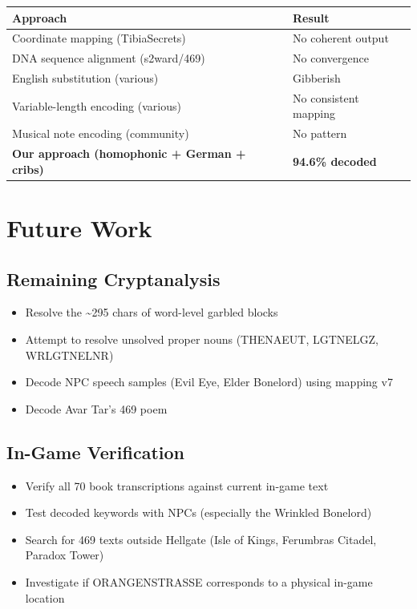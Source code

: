 \documentclass[11pt,a4paper]{article}
\begin{document}
\begin{table}[h]
\centering
\begin{tabular}{ll}
\toprule
Approach & Result \\
\midrule
Coordinate mapping (TibiaSecrets) & No coherent output \\
DNA sequence alignment (s2ward/469) & No convergence \\
English substitution (various) & Gibberish \\
Variable-length encoding (various) & No consistent mapping \\
Musical note encoding (community) & No pattern \\
\textbf{Our approach (homophonic + German + cribs)} & \textbf{94.6\% decoded} \\
\bottomrule
\end{tabular}
\end{table}

\section{Future Work}

\subsection{Remaining Cryptanalysis}

\begin{itemize}
\item Resolve the \~{}295 chars of word-level garbled blocks
\item Attempt to resolve unsolved proper nouns (THENAEUT, LGTNELGZ, WRLGTNELNR)
\item Decode NPC speech samples (Evil Eye, Elder Bonelord) using mapping v7
\item Decode Avar Tar's 469 poem
\end{itemize}

\subsection{In-Game Verification}

\begin{itemize}
\item Verify all 70 book transcriptions against current in-game text
\item Test decoded keywords with NPCs (especially the Wrinkled Bonelord)
\item Search for 469 texts outside Hellgate (Isle of Kings, Ferumbras Citadel, Paradox Tower)
\item Investigate if ORANGENSTRASSE corresponds to a physical in-game location
\end{itemize}
\end{document}
